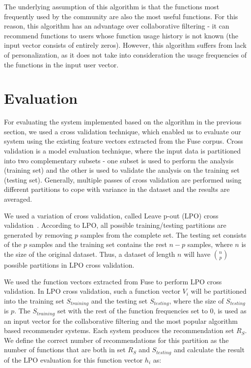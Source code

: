 \documentclass[conference]{IEEEtran}
\begin{document}
The underlying assumption of this algorithm is that the functions most frequently used by the community are also the most useful functions. For this reason, this algorithm has an advantage over collaborative filtering - it can recommend functions to users whose function usage history is not known (the input vector consists of entirely zeros). However, this algorithm suffers from lack of personalization, as it does not take into consideration the usage frequencies of the functions in the input user vector.

\section{Evaluation}
For evaluating the system implemented based on the algorithm in the previous section, we used a cross validation technique, which enabled us to evaluate our system using the existing feature vectors extracted from the Fuse corpus. Cross validation is a model evaluation technique, where the input data is partitioned into two complementary subsets - one subset is used to perform the analysis (training set) and the other is used to validate the analysis on the training set (testing set). Generally, multiple passes of cross validation are performed using different partitions  to cope with variance in the dataset and the results are averaged.

We used a variation of cross validation, called Leave p-out (LPO) cross validation~\cite{arlot2010survey}. According to LPO, all possible training/testing partitions are generated by removing $p$ samples from the complete set. The testing set consists of the $p$ samples and the training set contains the rest $n-p$ samples, where $n$ is the size of the original dataset. Thus, a dataset of length $n$ will have $n \choose p$ possible partitions in LPO cross validation.

We used the function vectors extracted from Fuse to perform LPO cross validation. In LPO cross validation, such a function vector $V_i$ will be partitioned into the training set $S_{training}$ and the testing set $S_{testing}$, where the size of $S_{testing}$ is $p$. The $S_{training}$ set with the rest of the function frequencies set to 0, is used as an input vector for the collaborative filtering and the most popular algorithm based recommender systems. Each system produces the recommendation set $R_S$. We define the correct number of recommendations for this partition as the number of functions that are both in set $R_S$ and $S_{testing}$ and calculate the result of the LPO evaluation for this function vector $h_i$ as:
\end{document}
